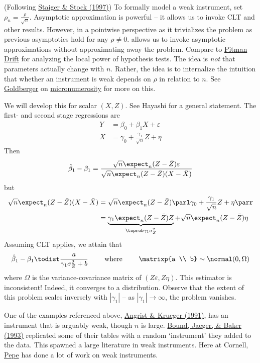 \documentclass[10pt]{article}
\begin{document}
\begin{example}
	(Following \href{jstor.org/stable/2171753?seq=1}{Staiger \& Stock (1997)}) To formally model a weak instrument, set $\rho_n = \frac{\rho}{\sqrt{n}}$. Asymptotic approximation is powerful -- it allows us to invoke CLT and other results. However, in a pointwise perspective as it trivializes the problem as previous asymptotics hold for any $\rho \ne 0$.  allows us to invoke asymptotic approximations without approximating away the problem. Compare to \href{http://www.econ.uiuc.edu/~roger/courses/574/lectures/L12.pdf}{Pitman Drift} for analyzing the local power of hypothesis tests. The idea is \emph{not} that parameters actually change with $n$. Rather, the idea is to internalize the intuition that whether an instrument is weak depends on $\rho$ in relation to $n$. See \href{https://en.wikipedia.org/wiki/Arthur_Goldberger}{Goldberger} on \href{http://korora.econ.yale.edu/et/interview/goldberger.pdf}{micronumerosity} for more on this.
	
	We will develop this for scalar $(X,Z)$. See Hayashi for a general statement. The first- and second stage regressions are
	\begin{align*}
		Y &= \beta_0 + \beta_1 X + \varepsilon \\X &= \gamma_0 + \frac{\gamma_1}{\sqrt{n}}Z + \eta
	\end{align*}
	Then \[\hat{\beta}_1 - \beta_1 = \frac{\sqrt{n}\expect_n (Z - \bar{Z})\varepsilon}{\sqrt{n}\expect_n(Z - \bar{Z})(X - \bar{X})}\]but\begin{align*}\sqrt{n}\expect_n(Z - \bar{Z})(X - \bar{X}) &= \sqrt{n}\expect_n (Z - \bar{Z})\parl \gamma_0 + \frac{\gamma_1}{\sqrt{n}} Z + \eta\parr \\ &= \underbrace{\gamma_1 \expect_n (Z - \bar{Z})Z}_{\toprob \gamma_1 \sigma_Z^2} + \sqrt{n}\expect_n (Z - \bar{Z})\eta\end{align*}Assuming CLT applies, we attain that \[\hat{\beta}_1 - \beta_1 \todist \frac{a}{\gamma_1 \sigma^2_Z + b}\qquad \text{ where } \qquad \matrixp{a \\ b} \sim \normal(0,\Omega)\]where $\Omega$ is the variance-covariance matrix of $(Z\varepsilon,Z\eta)$. This estimator is inconsistent! Indeed, it converges to a distribution. Observe that the extent of this problem scales inversely with $|\gamma_1|$ -- as $|\gamma_1| \to \infty$, the problem vanishes. 
\end{example}

\begin{remark}
	One of the examples referenced above, \href{https://www.jstor.org/stable/2937954?seq=1}{Angrist \& Krueger (1991)}, has an instrument that is arguably weak, though $n$ is large. \href{https://www.tandfonline.com/doi/abs/10.1080/01621459.1995.10476536}{Bound, Jaeger, \& Baker (1993)} replicated some of their tables with a random `instrument' they added to the data. This spawned a large literature in weak instruments. Here at Cornell, \href{https://joseluismontielolea.com/}{Pepe} has done a lot of work on weak instruments.
\end{remark}
\end{document}
